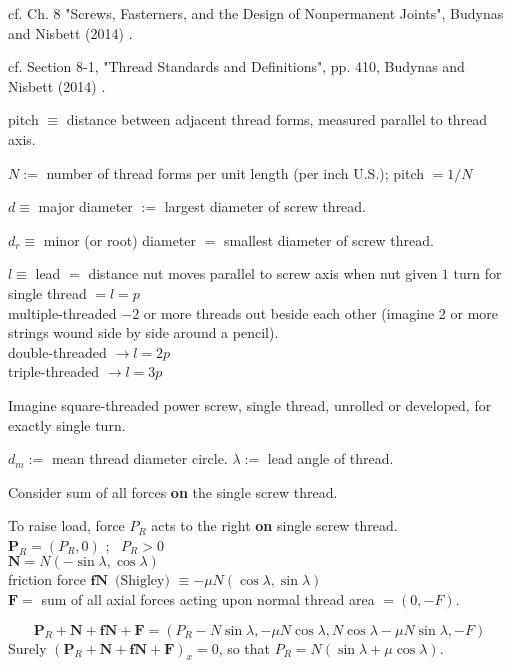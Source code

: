 \documentclass[10pt]{amsart}
\begin{document}
\begin{multicols*}{2}
cf. Ch. 8 "Screws, Fasterners, and the Design of Nonpermanent Joints", Budynas and Nisbett (2014) \cite{BuNi2014}.  

cf. Section 8-1, "Thread Standards and Definitions", pp. 410, Budynas and Nisbett (2014) \cite{BuNi2014}.  
 
pitch $\equiv $ distance between adjacent thread forms, measured parallel to thread axis.  

$N :=$ number of thread forms per unit length (per inch U.S.); pitch $=1/N$  

$d\equiv $ major diameter $:=$ largest diameter of screw thread.  

$d_r \equiv $ minor (or root) diameter $=$ smallest diameter of screw thread.  

$l \equiv $ lead $=$ distance nut moves parallel to screw axis when nut given $1$ turn for \\
single thread $=l=p$  \\
multiple-threaded $- 2 $ or more threads out beside each other (imagine 2 or more strings wound side by side around a pencil).  \\
double-threaded $\to l = 2p$  \\
triple-threaded $\to l=3p$  

Imagine square-threaded power screw, single thread, unrolled or developed, for exactly single turn.  

$d_m:= $ mean thread diameter circle.  $\lambda := $ lead angle of thread.  

Consider sum of all forces \textbf{on} the single screw thread.  

To raise load, force $P_R$ acts to the right \textbf{on} single screw thread.   \\
$\mathbf{P}_R = (P_R,0)$ ; \, $P_R >0$ \\
$\mathbf{N}= N (-\sin{\lambda}, \cos{\lambda} )$  \\ 
friction force $\mathbf{fN} \, \text{ (Shigley) } \equiv - \mu N(\cos{\lambda}, \sin{\lambda})$ \\
$\mathbf{F} =$ sum of all axial forces acting upon normal thread area $=(0,-F)$.  

\begin{equation}
	\mathbf{P}_R + \mathbf{N} + \mathbf{fN} + \mathbf{F} = (P_R-N\sin{\lambda} , - \mu N \cos{\lambda}, N\cos{\lambda} - \mu N\sin{\lambda}, -F)
\end{equation}
Surely $(\mathbf{P}_R + \mathbf{N} + \mathbf{fN} + \mathbf{F})_x =0$, so that $P_R = N( \sin{\lambda} + \mu \cos{\lambda})$.  


\end{multicols*}
\end{document}
